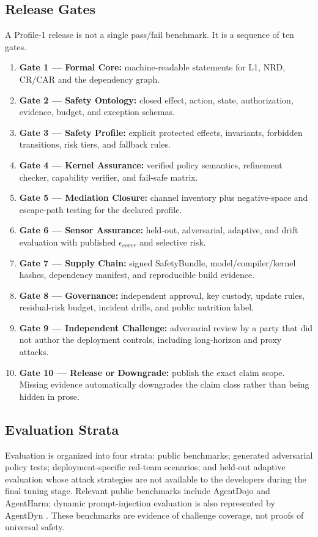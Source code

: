 \documentclass[11pt]{article}
\def\ensuremath#1{#1}%
\def\mathrm#1{#1}%
\newcommand{\epscover}{\ensuremath{\epsilon_{\mathrm{cover}}}}
\newcommand{\SafetyBundle}{\textsf{SafetyBundle}}
\begin{document}
\subsection{Release Gates}
A Profile-1 release is not a single pass/fail benchmark. It is a sequence of ten gates.
\begin{enumerate}
\item \textbf{Gate 1 --- Formal Core:} machine-readable statements for L1, NRD, CR/CAR and the dependency graph.
\item \textbf{Gate 2 --- Safety Ontology:} closed effect, action, state, authorization, evidence, budget, and exception schemas.
\item \textbf{Gate 3 --- Safety Profile:} explicit protected effects, invariants, forbidden transitions, risk tiers, and fallback rules.
\item \textbf{Gate 4 --- Kernel Assurance:} verified policy semantics, refinement checker, capability verifier, and fail-safe matrix.
\item \textbf{Gate 5 --- Mediation Closure:} channel inventory plus negative-space and escape-path testing for the declared profile.
\item \textbf{Gate 6 --- Sensor Assurance:} held-out, adversarial, adaptive, and drift evaluation with published \(\epscover\) and selective risk.
\item \textbf{Gate 7 --- Supply Chain:} signed \SafetyBundle{}, model/compiler/kernel hashes, dependency manifest, and reproducible build evidence.
\item \textbf{Gate 8 --- Governance:} independent approval, key custody, update rules, residual-risk budget, incident drills, and public nutrition label.
\item \textbf{Gate 9 --- Independent Challenge:} adversarial review by a party that did not author the deployment controls, including long-horizon and proxy attacks.
\item \textbf{Gate 10 --- Release or Downgrade:} publish the exact claim scope. Missing evidence automatically downgrades the claim class rather than being hidden in prose.
\end{enumerate}

\subsection{Evaluation Strata}
Evaluation is organized into four strata: public benchmarks; generated adversarial policy tests; deployment-specific red-team scenarios; and held-out adaptive evaluation whose attack strategies are not available to the developers during the final tuning stage. Relevant public benchmarks include AgentDojo and AgentHarm; dynamic prompt-injection evaluation is also represented by AgentDyn \cite{agentdojo,agentharm,agentdyn}. These benchmarks are evidence of challenge coverage, not proofs of universal safety.
\end{document}

